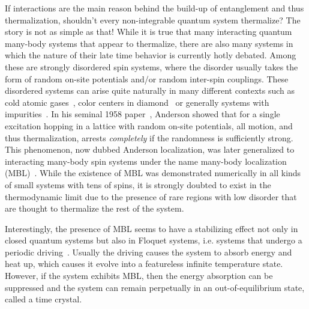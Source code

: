 


If interactions are the main reason behind the build-up of entanglement and thus thermalization, shouldn't every non-integrable quantum system thermalize? The story is not as simple as that! While it is true that many interacting quantum many-body systems that appear to thermalize, there are also many systems in which the nature of their late time behavior is currently hotly debated. Among these are strongly disordered spin systems, where the disorder usually takes the form of random on-site potentials and/or random inter-spin couplings. These disordered systems can arise quite naturally in many different contexts such as cold atomic gases~\cite{schreiberObservationManybodyLocalization2015,kondovDisorderInducedLocalizationStrongly2015}, color centers in diamond~\cite{kucskoCriticalThermalizationDisordered2018,martinControllingLocalThermalization2023} or generally systems with impurities~\cite{weiExploringLocalizationNuclear2018,silevitchTuningHighQNonlinear2019}.
In his seminal 1958 paper~\cite{andersonAbsenceDiffusionCertain1958}, Anderson showed that for a single excitation hopping in a lattice with random on-site potentials, all motion, and thus thermalization, arrests \emph{completely} if the randomness is sufficiently strong.
This phenomenon, now dubbed Anderson localization, was later generalized to interacting many-body spin systems under the name many-body localization (MBL)~\cite{fleishmanInteractionsAndersonTransition1980,baskoMetalinsulatorTransitionWeakly2006,gornyiInteractingElectronsDisordered2005,bauerAreaLawsManybody2013}.
While the existence of MBL was demonstrated numerically in all kinds of small systems with tens of spins, it is strongly doubted to exist in the thermodynamic limit due to the presence of rare regions with low disorder that are thought to thermalize the rest of the system. 



Interestingly, the presence of MBL seems to have a stabilizing effect not only in closed quantum systems but also in Floquet systems, i.e. systems that undergo a periodic driving~\cite{abaninTheoryManybodyLocalization2016,elsePrethermalPhasesMatter2017,bordiaPeriodicallyDrivingManyBody2017,elseDiscreteTimeCrystals2020a}.
Usually the driving causes the system to absorb energy and heat up, which causes it evolve into a featureless infinite temperature state. However, if the system exhibits MBL, then the energy absorption can be suppressed and the system can remain perpetually in an out-of-equilibrium state, called a time crystal.

